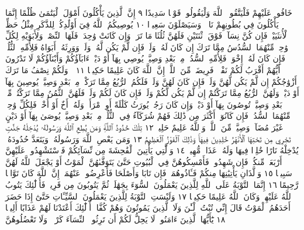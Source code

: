 خَافُوا۟ عَلَيْهِمْ فَلْيَتَّقُوا۟ ٱللَّهَ وَلْيَقُولُوا۟ قَوْلࣰا سَدِيدًا ٩ إِنَّ
ٱلَّذِينَ يَأْكُلُونَ أَمْوَٰلَ ٱلْيَتَٰمَىٰ ظُلْمًا إِنَّمَا يَأْكُلُونَ فِي
بُطُونِهِمْ نَارࣰاۖ وَسَيَصْلَوْنَ سَعِيرࣰا ١٠ يُوصِيكُمُ ٱللَّهُ فِيٓ
أَوْلَٰدِكُمْۖ لِلذَّكَرِ مِثْلُ حَظِّ ٱلْأُنثَيَيْنِۚ فَإِن كُنَّ نِسَآءࣰ
فَوْقَ ٱثْنَتَيْنِ فَلَهُنَّ ثُلُثَا مَا تَرَكَۖ وَإِن كَانَتْ وَٰحِدَةࣰ فَلَهَا
ٱلنِّصْفُۚ وَلِأَبَوَيْهِ لِكُلِّ وَٰحِدࣲ مِّنْهُمَا ٱلسُّدُسُ مِمَّا تَرَكَ إِن
كَانَ لَهُۥ وَلَدࣱۚ فَإِن لَّمْ يَكُن لَّهُۥ وَلَدࣱ وَوَرِثَهُۥٓ أَبَوَاهُ فَلِأُمِّهِ ٱلثُّلُثُۚ فَإِن
كَانَ لَهُۥٓ إِخْوَةࣱ فَلِأُمِّهِ ٱلسُّدُسُۚ مِنۢ بَعْدِ وَصِيَّةࣲ يُوصِي بِهَآ
أَوْ دَيْنٍۗ ءَابَآؤُكُمْ وَأَبْنَآؤُكُمْ لَا تَدْرُونَ أَيُّهُمْ أَقْرَبُ لَكُمْ
نَفْعࣰاۚ فَرِيضَةࣰ مِّنَ ٱللَّهِۗ إِنَّ ٱللَّهَ كَانَ عَلِيمًا حَكِيمࣰا ١١
۞ وَلَكُمْ نِصْفُ مَا تَرَكَ أَزْوَٰجُكُمْ إِن لَّمْ يَكُن
لَّهُنَّ وَلَدࣱۚ فَإِن كَانَ لَهُنَّ وَلَدࣱ فَلَكُمُ ٱلرُّبُعُ مِمَّا
تَرَكْنَۚ مِنۢ بَعْدِ وَصِيَّةࣲ يُوصِينَ بِهَآ أَوْ دَيْنࣲۚ
وَلَهُنَّ ٱلرُّبُعُ مِمَّا تَرَكْتُمْ إِن لَّمْ يَكُن لَّكُمْ وَلَدࣱۚ
فَإِن كَانَ لَكُمْ وَلَدࣱ فَلَهُنَّ ٱلثُّمُنُ مِمَّا تَرَكْتُمۚ
مِّنۢ بَعْدِ وَصِيَّةࣲ تُوصُونَ بِهَآ أَوْ دَيْنࣲۗ وَإِن كَانَ
رَجُلࣱ يُورَثُ كَلَٰلَةً أَوِ ٱمْرَأَةࣱ وَلَهُۥٓ أَخٌ أَوْ أُخْتࣱ فَلِكُلِّ
وَٰحِدࣲ مِّنْهُمَا ٱلسُّدُسُۚ فَإِن كَانُوٓا۟ أَكْثَرَ مِن ذَٰلِكَ
فَهُمْ شُرَكَآءُ فِي ٱلثُّلُثِۚ مِنۢ بَعْدِ وَصِيَّةࣲ يُوصَىٰ
بِهَآ أَوْ دَيْنٍ غَيْرَ مُضَآرࣲّۚ وَصِيَّةࣰ مِّنَ ٱللَّهِۗ وَٱللَّهُ
عَلِيمٌ حَلِيمࣱ ١٢ تِلْكَ حُدُودُ ٱللَّهِۚ وَمَن يُطِعِ ٱللَّهَ
وَرَسُولَهُۥ يُدْخِلْهُ جَنَّٰتࣲ تَجْرِي مِن تَحْتِهَا
ٱلْأَنْهَٰرُ خَٰلِدِينَ فِيهَاۚ وَذَٰلِكَ ٱلْفَوْزُ ٱلْعَظِيمُ ١٣
وَمَن يَعْصِ ٱللَّهَ وَرَسُولَهُۥ وَيَتَعَدَّ حُدُودَهُۥ
يُدْخِلْهُ نَارًا خَٰلِدࣰا فِيهَا وَلَهُۥ عَذَابࣱ مُّهِينࣱ ١٤
وَٱلَّٰتِي يَأْتِينَ ٱلْفَٰحِشَةَ مِن نِّسَآئِكُمْ فَٱسْتَشْهِدُوا۟ عَلَيْهِنَّ
أَرْبَعَةࣰ مِّنكُمْۖ فَإِن شَهِدُوا۟ فَأَمْسِكُوهُنَّ فِي ٱلْبُيُوتِ
حَتَّىٰ يَتَوَفَّىٰهُنَّ ٱلْمَوْتُ أَوْ يَجْعَلَ ٱللَّهُ لَهُنَّ سَبِيلࣰا ١٥
وَٱلَّذَانِ يَأْتِيَٰنِهَا مِنكُمْ فَـَٔاذُوهُمَاۖ فَإِن تَابَا وَأَصْلَحَا
فَأَعْرِضُوا۟ عَنْهُمَآۗ إِنَّ ٱللَّهَ كَانَ تَوَّابࣰا رَّحِيمًا ١٦
إِنَّمَا ٱلتَّوْبَةُ عَلَى ٱللَّهِ لِلَّذِينَ يَعْمَلُونَ ٱلسُّوٓءَ بِجَهَٰلَةࣲ
ثُمَّ يَتُوبُونَ مِن قَرِيبࣲ فَأُو۟لَٰٓئِكَ يَتُوبُ ٱللَّهُ عَلَيْهِمْۗ
وَكَانَ ٱللَّهُ عَلِيمًا حَكِيمࣰا ١٧ وَلَيْسَتِ ٱلتَّوْبَةُ لِلَّذِينَ
يَعْمَلُونَ ٱلسَّيِّـَٔاتِ حَتَّىٰٓ إِذَا حَضَرَ أَحَدَهُمُ ٱلْمَوْتُ
قَالَ إِنِّي تُبْتُ ٱلْـَٰٔنَ وَلَا ٱلَّذِينَ يَمُوتُونَ وَهُمْ كُفَّارٌۚ
أُو۟لَٰٓئِكَ أَعْتَدْنَا لَهُمْ عَذَابًا أَلِيمࣰا ١٨ يَٰٓأَيُّهَا ٱلَّذِينَ
ءَامَنُوا۟ لَا يَحِلُّ لَكُمْ أَن تَرِثُوا۟ ٱلنِّسَآءَ كَرْهࣰاۖ وَلَا تَعْضُلُوهُنَّ
